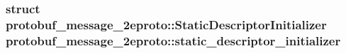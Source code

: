 \subsubsection[{\texorpdfstring{static\+\_\+descriptor\+\_\+initializer}{static_descriptor_initializer}}]{\setlength{\rightskip}{0pt plus 5cm}struct {\bf protobuf\+\_\+message\+\_\+2eproto\+::\+Static\+Descriptor\+Initializer}  protobuf\+\_\+message\+\_\+2eproto\+::static\+\_\+descriptor\+\_\+initializer}\hypertarget{namespaceprotobuf__message__2eproto_a326463751c85e569b98ef24ea8a840c9}{}\label{namespaceprotobuf__message__2eproto_a326463751c85e569b98ef24ea8a840c9}
